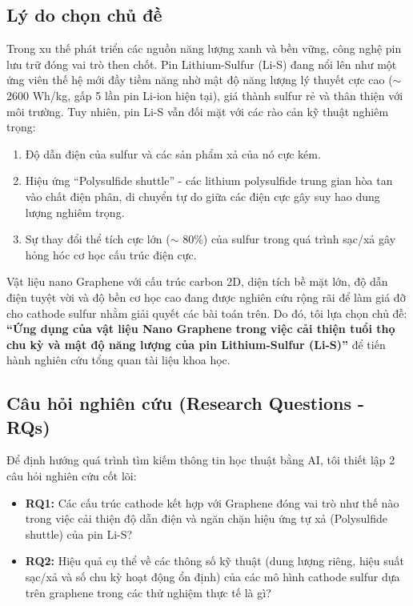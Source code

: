 \documentclass[12pt,a4paper]{article}
\begin{document}
\subsection{Lý do chọn chủ đề}
Trong xu thế phát triển các nguồn năng lượng xanh và bền vững, công nghệ pin lưu trữ đóng vai trò then chốt. Pin Lithium-Sulfur (Li-S) đang nổi lên như một ứng viên thế hệ mới đầy tiềm năng nhờ mật độ năng lượng lý thuyết cực cao ($\sim$ 2600 Wh/kg, gấp 5 lần pin Li-ion hiện tại), giá thành sulfur rẻ và thân thiện với môi trường. Tuy nhiên, pin Li-S vẫn đối mặt với các rào cản kỹ thuật nghiêm trọng:
\begin{enumerate}
    \item Độ dẫn điện của sulfur và các sản phẩm xả của nó cực kém.
    \item Hiệu ứng ``Polysulfide shuttle'' - các lithium polysulfide trung gian hòa tan vào chất điện phân, di chuyển tự do giữa các điện cực gây suy hao dung lượng nghiêm trọng.
    \item Sự thay đổi thể tích cực lớn ($\sim$ 80\%) của sulfur trong quá trình sạc/xả gây hỏng hóc cơ học cấu trúc điện cực.
\end{enumerate}
Vật liệu nano Graphene với cấu trúc carbon 2D, diện tích bề mặt lớn, độ dẫn điện tuyệt vời và độ bền cơ học cao đang được nghiên cứu rộng rãi để làm giá đỡ cho cathode sulfur nhằm giải quyết các bài toán trên. Do đó, tôi lựa chọn chủ đề: \textbf{``Ứng dụng của vật liệu Nano Graphene trong việc cải thiện tuổi thọ chu kỳ và mật độ năng lượng của pin Lithium-Sulfur (Li-S)''} để tiến hành nghiên cứu tổng quan tài liệu khoa học.

\subsection{Câu hỏi nghiên cứu (Research Questions - RQs)}
Để định hướng quá trình tìm kiếm thông tin học thuật bằng AI, tôi thiết lập 2 câu hỏi nghiên cứu cốt lõi:
\begin{itemize}
    \item \textbf{RQ1:} Các cấu trúc cathode kết hợp với Graphene đóng vai trò như thế nào trong việc cải thiện độ dẫn điện và ngăn chặn hiệu ứng tự xả (Polysulfide shuttle) của pin Li-S?
    \item \textbf{RQ2:} Hiệu quả cụ thể về các thông số kỹ thuật (dung lượng riêng, hiệu suất sạc/xả và số chu kỳ hoạt động ổn định) của các mô hình cathode sulfur dựa trên graphene trong các thử nghiệm thực tế là gì?
\end{itemize}
\end{document}
